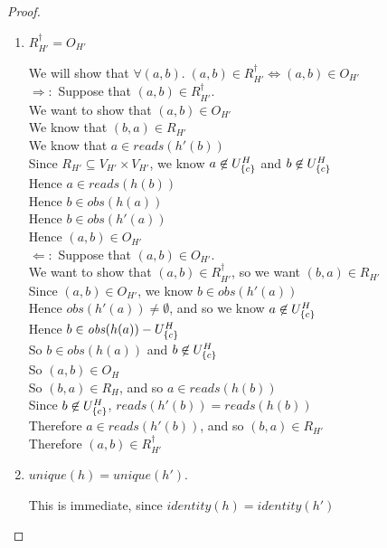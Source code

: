 \begin{proof}
\begin{enumerate}
\item $R^\dagger_{H'} = O_{H'}$ 
  \begin{tabbedproof}
    \oo We will show that $\forall (a,b).\; (a,b) \in R^\dagger_{H'} \iff (a,b) \in O_{H'}$ \\ 
    \oo $\Rightarrow:$ Suppose that $(a, b) \in R^\dagger_{H'}$. \\
    \ooo We want to show that $(a, b) \in O_{H'}$ \\
    \ooo We know that $(b, a) \in R_{H'}$ \\
    \ooo We know that $a \in \mathit{reads}(h'(b))$ \\
    \ooo Since $R_{H'} \subseteq V_{H'} \times V_{H'}$, we know $a \not\in U^H_{\{{c}\}}$ and $b \not \in U^H_{\{{c}\}}$ \\
    \ooo Hence $a \in \mathit{reads}(h(b))$ \\ 
    \ooo Hence $b \in \mathit{obs}(h(a))$ \\
    \ooo Hence $b \in \mathit{obs}(h'(a))$ \\
    \ooo Hence $(a,b) \in O_{H'}$ \\
    \oo $\Leftarrow:$ Suppose that $(a, b) \in O_{H'}$. \\
    \ooo We want to show that $(a,b) \in R^\dagger_{H'}$, so we want $(b,a) \in R_{H'}$ \\
    \ooo Since $(a,b) \in O_{H'}$, we know $b \in \mathit{obs}(h'(a))$ \\
    \ooo Hence $\mathit{obs}(h'(a)) \not= \emptyset$, and so we know $a \not\in U^H_{\{{c}\}}$ \\
    \ooo Hence $b \in \mathit{obs}(h(a)) - U^H_{\{{c}\}}$ \\
    \ooo So $b \in \mathit{obs}(h(a))$ and $b \not \in U^H_{\{{c}\}}$ \\
    \ooo So $(a,b) \in O_H$ \\
    \ooo So $(b,a) \in R_H$, and so $a \in \mathit{reads}(h(b))$ \\
    \ooo Since $b \not\in U^H_{\{{c}\}}$, $\mathit{reads}(h'(b)) = \mathit{reads}(h(b))$ \\
    \ooo Therefore $a \in \mathit{reads}(h'(b))$, and so $(b,a) \in R_{H'}$ \\
    \ooo Therefore $(a,b) \in R^\dagger_{H'}$ 
  \end{tabbedproof}

\item $\mathit{unique}(h) = \mathit{unique}(h')$.

This is immediate, since $\mathit{identity}(h) = \mathit{identity}(h')$ 
\end{enumerate}
\end{proof}


